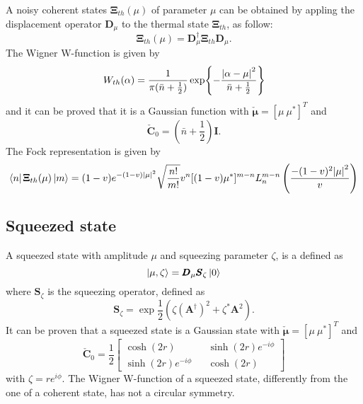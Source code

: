         A noisy coherent states $\pmb{\Xi}_{th}(\mu)$ of parameter $\mu$ can be obtained by 
        appling the displacement operator $\pmb{D}_\mu$ to the thermal state $\pmb{\Xi}_{th}$,
        as follow:
        \begin{equation}
            \pmb{\Xi}_{th}(\mu)=\pmb{D}_\mu^\dagger \pmb{\Xi}_{th} \pmb{D}_\mu.
        \end{equation}
        The Wigner W-function is given by \cite{QuantumNoise}
        \begin{equation}
            W_{th}(\alpha)=\frac{1}{\pi(\bar{n}+\frac{1}{2})}\exp{-\frac{\absolutevalue{\alpha-\mu}^2}
            {\bar{n}+\frac{1}{2}}}
            \label{WignerNCS}
        \end{equation}
        and it can be proved that it is a Gaussian function with $\check{\pmb{\mu}}=[\mu\ \mu^*]^T$
        and
        \begin{equation*}
            \check{\pmb{C}}_0=\left(\bar{n}+\frac{1}{2}\right)\pmb{I}.
        \end{equation*}
        The Fock representation is given by
        \begin{equation}
            \bra{n}\pmb{\Xi}_{th}(\mu)\ket{m}=(1-v)e^{-(1-v)\absolutevalue{\mu}^2}\sqrt{\frac{n!}{m!}}
            v^n[(1-v)\mu^*]^{m-n}L_n^{m-n}\left(\frac{-(1-v)^2\absolutevalue{\mu}^2}{v}\right)
            \label{eq:FRCS}
        \end{equation}

    \subsection{Squeezed state}
        \label{squeezedStates}
        A squeezed state with amplitude $\mu$ and squeezing parameter $\zeta$, is a defined as 
        \cite{tesiGuerrini,YuenRadField,QMnoiseInterf}
        \begin{equation}
            \ket{\mu,\zeta}=\pmb{D}_\mu\pmb{S}_\zeta\ket{0}
        \end{equation}
        where $\pmb{S}_\zeta$ is the squeezing operator, defined as
        \begin{equation}
            \pmb{S}_\zeta=\exp{\frac{1}{2}\left(\zeta\left(\pmb{A}^\dagger\right)^2+
            \zeta^*\pmb{A}^2\right)}.
        \end{equation}
        It can be proven that a squeezed state is a Gaussian state with $\check{\pmb{\mu}}=[\mu\ \mu^*]^T$
        and
        \begin{equation*}
            \check{\pmb{C}}_0=\frac{1}{2}
            \begin{bmatrix}
                \cosh(2r) && \sinh(2r)e^{-i\phi}\\
                \sinh(2r)e^{-i\phi} && \cosh(2r)
            \end{bmatrix}
        \end{equation*}
        with $\zeta=re^{i\phi}$.
        The Wigner W-function of a squeezed state, differently from the one of a coherent state, has not a 
        circular symmetry.


